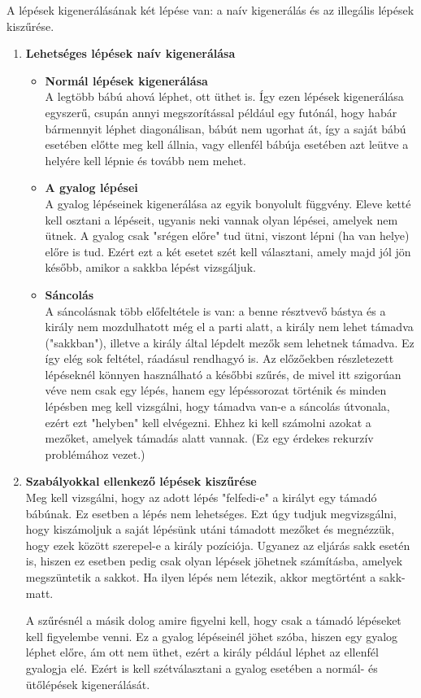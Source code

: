 \documentclass[twoside, a4paper, 12pt]{article}
\begin{document}
A lépések kigenerálásának két lépése van: a naív kigenerálás és az illegális lépések kiszűrése.
\begin{enumerate}
	\item \textbf{Lehetséges lépések naív kigenerálása}
		\begin{itemize}
			\item \textbf{Normál lépések kigenerálása} \\
			A legtöbb bábú ahová léphet, ott üthet is. Így ezen lépések kigenerálása egyszerű, csupán annyi megszorítással például egy futónál, hogy habár bármennyit léphet diagonálisan, bábút nem ugorhat át, így a saját bábú esetében előtte meg kell állnia, vagy ellenfél bábúja esetében azt leütve a helyére kell lépnie és tovább nem mehet.

			\item \textbf{A gyalog lépései} \\
			A gyalog lépéseinek kigenerálása az egyik bonyolult függvény. Eleve ketté kell osztani a lépéseit, ugyanis neki vannak olyan lépései, amelyek nem ütnek. A gyalog csak "srégen előre" tud ütni, viszont lépni (ha van helye) előre is tud. Ezért ezt a két esetet szét kell választani, amely majd jól jön később, amikor a sakkba lépést vizsgáljuk. 

			\item \textbf{Sáncolás} \\
			A sáncolásnak több előfeltétele is van: a benne résztvevő bástya és a király nem mozdulhatott még el a parti alatt, a király nem lehet támadva ("sakkban"), illetve a király által lépdelt mezők sem lehetnek támadva. Ez így elég sok feltétel, ráadásul rendhagyó is. Az előzőekben részletezett lépéseknél könnyen használható a későbbi szűrés, de mivel itt szigorúan véve nem csak egy lépés, hanem egy lépéssorozat történik és minden lépésben meg kell vizsgálni, hogy támadva van-e a sáncolás útvonala, ezért ezt "helyben" kell elvégezni. Ehhez ki kell számolni azokat a mezőket, amelyek támadás alatt vannak. (Ez egy érdekes rekurzív problémához vezet.)
		\end{itemize}
		
	\item \textbf{Szabályokkal ellenkező lépések kiszűrése} \\
		Meg kell vizsgálni, hogy az adott lépés "felfedi-e" a királyt egy támadó bábúnak. Ez esetben a lépés nem lehetséges. Ezt úgy tudjuk megvizsgálni, hogy kiszámoljuk a saját lépésünk utáni támadott mezőket és megnézzük, hogy ezek között szerepel-e a király pozíciója. Ugyanez az eljárás sakk esetén is, hiszen ez esetben pedig csak olyan lépések jöhetnek számításba, amelyek megszüntetik a sakkot. Ha ilyen lépés nem létezik, akkor megtörtént a sakk-matt.
		
		A szűrésnél a másik dolog amire figyelni kell, hogy csak a támadó lépéseket kell figyelembe venni. Ez a gyalog lépéseinél jöhet szóba, hiszen egy gyalog léphet előre, ám ott nem üthet, ezért a király például léphet az ellenfél gyalogja elé. Ezért is kell szétválasztani a gyalog esetében a normál- és ütőlépések kigenerálását.
\end{enumerate}
\end{document}
